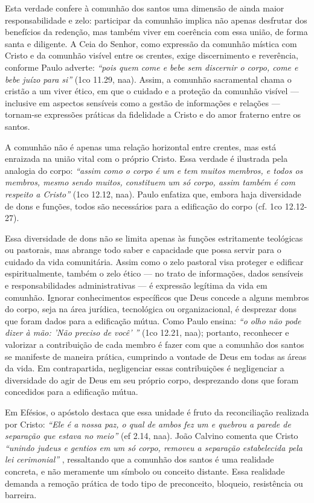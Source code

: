 Esta verdade confere à comunhão dos santos uma dimensão de ainda maior responsabilidade e zelo: participar da comunhão implica não apenas desfrutar dos benefícios da redenção, mas também viver em coerência com essa união, de forma santa e diligente. A Ceia do Senhor, como expressão da comunhão mística com Cristo e da comunhão visível entre os crentes, exige discernimento e reverência, conforme Paulo adverte: \textit{``pois quem come e bebe sem discernir o corpo, come e bebe juízo para si''} (\gls{1co} 11.29, \gls{naa}). Assim, a comunhão sacramental chama o cristão a um viver ético, em que o cuidado e a proteção da comunhão visível — inclusive em aspectos sensíveis como a gestão de informações e relações — tornam-se expressões práticas da fidelidade a Cristo e do amor fraterno entre os santos.

A comunhão não é apenas uma relação horizontal entre crentes, mas está enraizada na união vital com o próprio Cristo. Essa verdade é ilustrada pela analogia do corpo: \textit{``assim como o corpo é um e tem muitos membros, e todos os membros, mesmo sendo muitos, constituem um só corpo, assim também é com respeito a Cristo''} (\gls{1co} 12.12, \gls{naa}). Paulo enfatiza que, embora haja diversidade de dons e funções, todos são necessários para a edificação do corpo (cf. \gls{1co} 12.12-27).

Essa diversidade de dons não se limita apenas às funções estritamente teológicas ou pastorais, mas abrange todo saber e capacidade que possa servir para o cuidado da vida comunitária. Assim como o zelo pastoral visa proteger e edificar espiritualmente, também o zelo ético — no trato de informações, dados sensíveis e responsabilidades administrativas — é expressão legítima da vida em comunhão. Ignorar conhecimentos específicos que Deus concede a alguns membros do corpo, seja na área jurídica, tecnológica ou organizacional, é desprezar dons que foram dados para a edificação mútua. Como Paulo ensina: \textit{``o olho não pode dizer à mão: 'Não preciso de você' ''} (\gls{1co} 12.21, \gls{naa}); portanto, reconhecer e valorizar a contribuição de cada membro é fazer com que a comunhão dos santos se manifeste de maneira prática, cumprindo a vontade de Deus em todas as áreas da vida. Em contrapartida, negligenciar essas contribuições é negligenciar a diversidade do agir de Deus em seu próprio corpo, desprezando dons que foram concedidos para a edificação mútua.

Em Efésios, o apóstolo destaca que essa unidade é fruto da reconciliação realizada por Cristo: \textit{``Ele é a nossa paz, o qual de ambos fez um e quebrou a parede de separação que estava no meio''} (\gls{ef} 2.14, \gls{naa}). João Calvino comenta que Cristo \textit{``unindo judeus e gentios em um só corpo, removeu a separação estabelecida pela lei cerimonial''} \cite{calvinoEf2}, ressaltando que a comunhão dos santos é uma realidade concreta, e não meramente um símbolo ou conceito distante. Essa realidade demanda a remoção prática de todo tipo de preconceito, bloqueio, resistência ou barreira.

